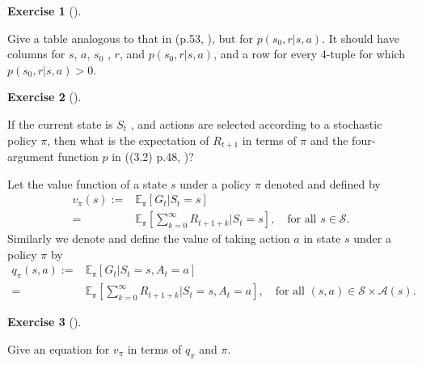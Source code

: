 \documentclass[
  letterpaper,
]{krantz}
\theoremstyle{plain}
\theoremstyle{definition}
\theoremstyle{definition}
\newtheorem{exercise}{Exercise}[chapter]
\theoremstyle{remark}
\begin{document}
\begin{exercise}[]\protect\hypertarget{exr--hw_003_02}{}\label{exr--hw_003_02}

Give a table analogous to that in (p.53,
), but for
\(p(s_0 , r |s, a)\). It should have columns for \(s\), \(a\), \(s_0\) ,
\(r\), and \(p(s_0 , r |s, a)\), and a row for every 4-tuple for which
\(p(s_0 , r |s, a) > 0\).

\end{exercise}

\begin{exercise}[]\protect\hypertarget{exr--hw_003_03}{}\label{exr--hw_003_03}

If the current state is \(S_t\) , and actions are selected according to
a stochastic policy \(\pi\), then what is the expectation of \(R_{t+1}\)
in terms of \(\pi\) and the four-argument function \(p\) in ((3.2) p.48,
)?

\end{exercise}

Let the value function of a state \(s\) under a policy \(\pi\) denoted
and defined by \[
\begin{aligned}
    v_{\pi}(s):=  &
        \mathbb{E_{\pi}}
        \left[
            G_t | S_t = s
        \right]
        \\
        = &
        \mathbb{E_{\pi}}
        \left[
            \sum_{k=0}^{\infty}
                R_{t+1+k}
                \Big |
                S_t = s
        \right], \quad \text{for all } s\in \mathcal{S}.
\end{aligned}
\] Similarly we denote and define the value of taking action \(a\) in
state \(s\) under a policy \(\pi\) by \[
\begin{aligned}
    q_{\pi}(s,a):=  &
        \mathbb{E_{\pi}}
        \left[
            G_t | S_t = s, A_t = a
        \right]
        \\
        = &
        \mathbb{E_{\pi}}
        \left[
            \sum_{k=0}^{\infty}
                R_{t+1+k}
                \Big |
                S_t = s, A_t = a
        \right], \quad \text{for all } (s,a) \in \mathcal{S}\times \mathcal{A}(s).
\end{aligned}
\]

\begin{exercise}[]\protect\hypertarget{exr--hw_003_04}{}\label{exr--hw_003_04}

Give an equation for \(v_{\pi}\) in terms of \(q_{\pi}\) and \(\pi\).

\end{exercise}
\end{document}
